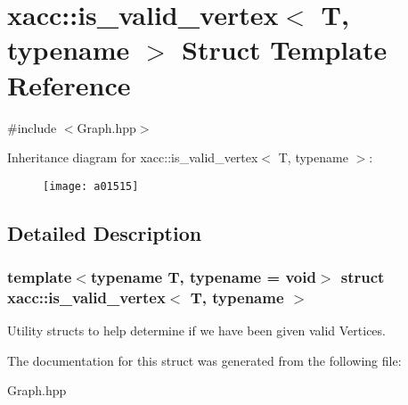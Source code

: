 \hypertarget{a01515}{}\section{xacc\+:\+:is\+\_\+valid\+\_\+vertex$<$ T, typename $>$ Struct Template Reference}
\label{a01515}


{\ttfamily \#include $<$Graph.\+hpp$>$}

Inheritance diagram for xacc\+:\+:is\+\_\+valid\+\_\+vertex$<$ T, typename $>$\+:\begin{figure}[H]
\begin{center}
\leavevmode
\texttt{[image: a01515]}
\end{center}
\end{figure}


\subsection{Detailed Description}
\subsubsection*{template$<$typename T, typename = void$>$\newline
struct xacc\+::is\+\_\+valid\+\_\+vertex$<$ T, typename $>$}

Utility structs to help determine if we have been given valid Vertices. 

The documentation for this struct was generated from the following file\+:\begin{DoxyCompactItemize}
\item 
Graph.\+hpp\end{DoxyCompactItemize}
